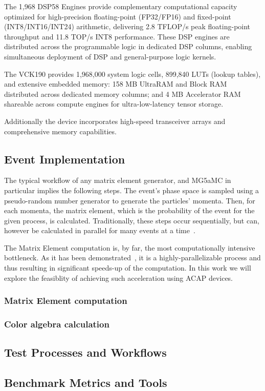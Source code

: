 The 1,968 DSP58 Engines provide complementary computational capacity optimized for high-precision floating-point (FP32/FP16) and fixed-point (INT8/INT16/INT24) arithmetic, delivering 2.8 TFLOP/s peak floating-point throughput and 11.8 TOP/s INT8 performance. These DSP engines are distributed across the programmable logic in dedicated DSP columns, enabling simultaneous deployment of DSP and general-purpose logic kernels.

The VCK190 provides 1,968,000 system logic cells, 899,840 LUTs (lookup tables), and extensive embedded memory: 158 MB UltraRAM and Block RAM distributed across dedicated memory columns; and 
4 MB Accelerator RAM shareable across compute engines for ultra-low-latency tensor storage. 

Additionally the device incorporates high-speed transceiver arrays and comprehensive memory capabilities. 

\subsection{Event Implementation}
The typical workflow of any matrix element generator, and MG5aMC in particular implies the following steps. The event's phase space is sampled using a pseudo-random number generator to generate the particles' momenta. Then, for each momenta, the matrix element, which is the probability of the event for the given process, is calculated. Traditionally, these steps occur sequentially, but can, however be calculated in parallel for many events at a time~\cite{Wettersten:2023ekm}. 

The Matrix Element computation is, by far, the most computationally intensive bottleneck. As it has been demonstrated~\cite{Valassi:2025xfn}, it is a highly-parallelizable process and thus resulting in significant speeds-up of the computation. In this work we will explore the feasiblity of achieving such acceleration using ACAP devices. 

\subsubsection{Matrix Element computation}

\subsubsection{Color algebra calculation}

\subsection{Test Processes and Workflows}

\subsection{Benchmark Metrics and Tools}
